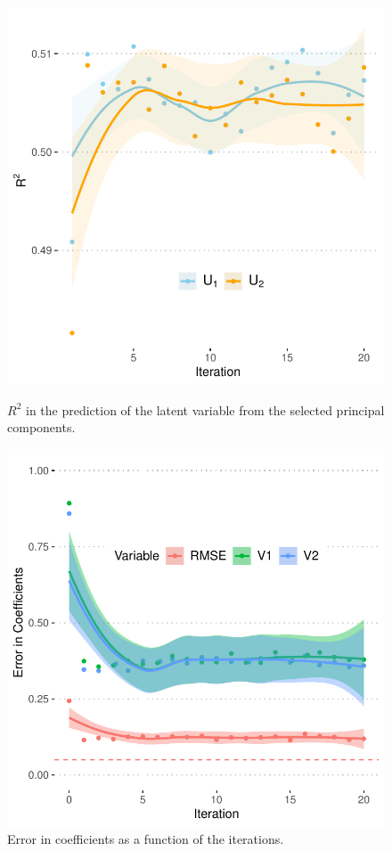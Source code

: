 \documentclass[letterpaper]{article}
\begin{document}
\begin{figure}[ht]
  \centering
  \begin{minipage}[t]{0.42\linewidth}
    \includegraphics[scale=0.3]{images/fig_paper_r2lat.pdf}
    \caption{\label{fig:latrecons}$R^2$ in the prediction of the latent variable from the selected principal components.\medskip}
  \end{minipage}\hfill
  \begin{minipage}[t]{0.42\linewidth}
    \includegraphics[scale=0.3]{images/fig_paper_errors.pdf}
    \caption{\label{fig:errorcoef}Error in coefficients as a function of the iterations.\medskip}
  \end{minipage}
\end{figure}
\end{document}

